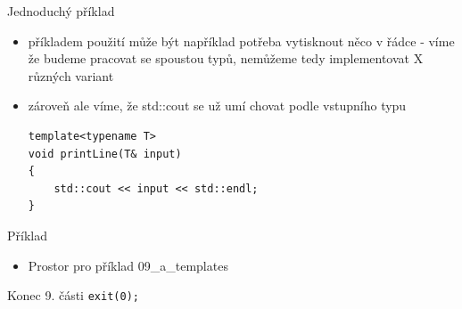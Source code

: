 \documentclass{beamer}
\begin{document}
\begin{xframe}{Jednoduchý příklad}
	\begin{itemize}
		\item příkladem použití může být například potřeba vytisknout něco v řádce - víme že budeme pracovat se spoustou typů, nemůžeme tedy implementovat X různých variant
		\item zároveň ale víme, že std::cout se už umí chovat podle vstupního typu
\begin{lstlisting}[basicstyle=\fontsize{8}{9}\selectfont\ttfamily]
template<typename T>
void printLine(T& input)
{
    std::cout << input << std::endl;
}
\end{lstlisting}
	\end{itemize}
\end{xframe}


\begin{xframe}{Příklad}
	\begin{itemize}
		\item Prostor pro příklad 09\_a\_templates
	\end{itemize}
\end{xframe}




\begin{xframe}{Konec 9. části}
\texttt{exit(0);}
\end{xframe}
\end{document}
